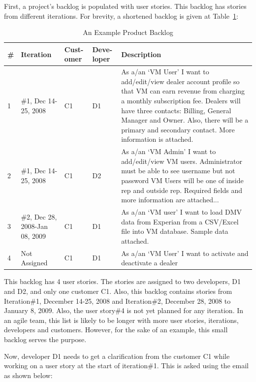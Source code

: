 First, a project's backlog is populated with user stories. This backlog has stories from different iterations. For brevity, a shortened backlog is given at Table~\ref{tab:backlog}:

\begin{table}[h!]
  \centering
  \caption{An Example Product Backlog}
    \begin{tabular}{|p{0.5cm}|p{1.7cm}|p{1.2cm}|p{1.2cm}|p{9cm}|}
      \hline
      \textbf{\#} & \textbf{Iteration} & \textbf{Cust- omer} & \textbf{Deve- loper} & \textbf{Description}\\
      \hline
		1 & \#1, Dec 14-25, 2008 & C1 & D1 & As a/an `VM User' I want to add/edit/view dealer account profile so that VM can earn revenue from charging a monthly subscription fee.
			Dealers will have three contacts: Billing, General Manager and Owner. Also, there will be a primary and secondary contact. More information is attached.\\
      \hline
		2 & \#1, Dec 14-25, 2008 & C1 & D2 & As a/an `VM Admin' I want to add/edit/view VM users. 
		Administrator must be able to see username but not password VM Users will be one of inside rep and outside rep. 
		Required fields and more information are attached...\\
	  \hline
		3 & \#2, Dec 28, 2008-Jan 08, 2009 & C1 & D1 & As a/an `VM user' I want to load DMV data from Experian from a CSV/Excel file into VM database. Sample data attached.\\
	  \hline
		4 & Not Assigned & C1 & D1 & As a/an `VM User' I want to activate and deactivate a dealer\\
	  \hline
    \end{tabular}
		\label{tab:backlog}
\end{table}

This backlog has 4 user stories. The stories are assigned to two developers, D1 and D2, and only one customer C1. Also, this backlog contains stories from Iteration\#1, December 14-25, 2008 and Iteration\#2, December 28, 2008 to January 8, 2009. Also, the user story\#4 is not yet planned for any iteration. In an agile team, this list is likely to be longer with more user stories, iterations, developers and customers. However, for the sake of an example, this small backlog serves the purpose.

Now, developer D1 needs to get a clarification from the customer C1 while working on a user story at the start of iteration\#1. This is asked using the email as shown below:

